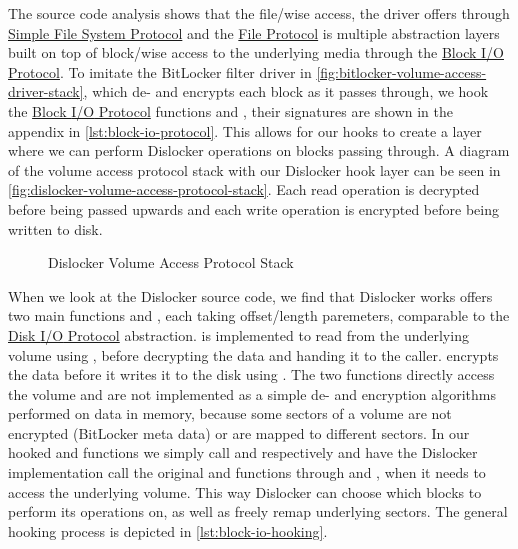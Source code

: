The source code analysis shows that the file\-/wise access, the driver offers through \hyperref[lst:simple-file-system-protocol]{Simple File System Protocol} and the \hyperref[lst:simple-file-system-protocol]{File Protocol} is multiple abstraction layers built on top of block\-/wise access to the underlying media through the \hyperref[lst:block-io-protocol]{Block \ac{I/O} Protocol}.
To imitate the BitLocker filter driver in \autoref{fig:bitlocker-volume-access-driver-stack}, which de- and encrypts each block as it passes through, we hook the \hyperref[lst:block-io-protocol]{Block \ac{I/O} Protocol} functions  and , their signatures are shown in the appendix in \autoref{lst:block-io-protocol}.
This allows for our hooks to create a layer where we can perform Dislocker operations on blocks passing through.
A diagram of the volume access protocol stack with our Dislocker hook layer can be seen in \autoref{fig:dislocker-volume-access-protocol-stack}.
Each read operation is decrypted before being passed upwards and each write operation is encrypted before being written to disk.

\begin{figure}[htb]%
    \centering
    
    \caption{Dislocker Volume Access Protocol Stack}%
    \label{fig:dislocker-volume-access-protocol-stack}%
\end{figure}

When we look at the Dislocker source code, we find that Dislocker works offers two main functions  and , each taking offset\-/length paremeters, comparable to the \hyperref[lst:disk-io-protocol]{Disk \ac{I/O} Protocol} abstraction.
 is implemented to read from the underlying volume using , before decrypting the data and handing it to the caller.
 encrypts the data before it writes it to the disk using .
The two functions directly access the volume and are not implemented as a simple de- and encryption algorithms performed on data in memory, because some sectors of a volume are not encrypted (BitLocker meta data) or are mapped to different sectors.
In our hooked  and  functions we simply call  and  respectively and have the Dislocker implementation call the original  and  functions through  and , when it needs to access the underlying volume.
This way Dislocker can choose which blocks to perform its operations on, as well as freely remap underlying sectors.
The general hooking process is depicted in \autoref{lst:block-io-hooking}.

